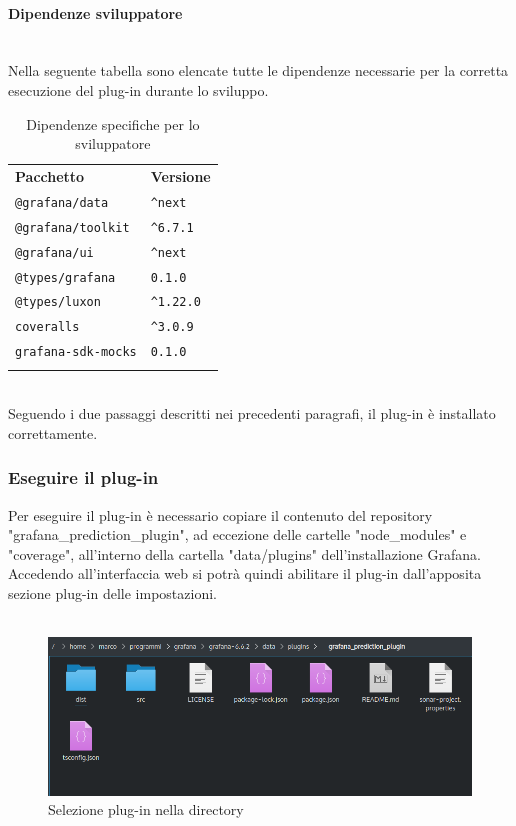 \paragraph*{Dipendenze sviluppatore}\mbox{}\\ [1mm]
Nella seguente tabella sono elencate tutte le dipendenze necessarie per la corretta esecuzione del plug-in durante lo sviluppo.
\setcounter{table}{1}
\begin{longtable} {
		>{}p{65mm} 
		>{}p{30mm}
	}
	\rowcolor{gray!50}
	\textbf{Pacchetto} & \textbf{Versione} \TBstrut \\ [2mm]
	\verb|@grafana/data| & \verb|^next| \TBstrut \\ [2mm]
	\verb|@grafana/toolkit| & \verb|^6.7.1| \TBstrut \\ [2mm]
	\verb|@grafana/ui| & \verb|^next| \TBstrut \\ [2mm]
	\verb|@types/grafana| & \verb|0.1.0| \TBstrut \\ [2mm]
	\verb|@types/luxon| & \verb|^1.22.0| \TBstrut \\ [2mm]
	\verb|coveralls| & \verb|^3.0.9| \TBstrut \\ [2mm]
	\verb|grafana-sdk-mocks| & \verb|0.1.0| \TBstrut \\ [2mm]
	\rowcolor{white}
	\caption{Dipendenze specifiche per lo sviluppatore}
\end{longtable}
\mbox{}\\ [1mm]
Seguendo i due passaggi descritti nei precedenti paragrafi, il plug-in è installato correttamente.

\subsubsection{Eseguire il plug-in}%
Per eseguire il plug-in è necessario copiare il contenuto del repository "grafana\_prediction\_plugin", ad eccezione delle cartelle "node\_modules" e "coverage", all'interno della cartella "data/plugins" dell'installazione Grafana\glo. Accedendo all'interfaccia web si potrà quindi abilitare il plug-in dall'apposita sezione plug-in delle impostazioni.
\\
\\
\begin{figure}[H] 	
	\begin{center}
		\includegraphics[width=\textwidth,height=\textheight,keepaspectratio]{img/plugin-directory.png}
	\end{center}
	\caption{Selezione plug-in nella directory}	
\end{figure}

